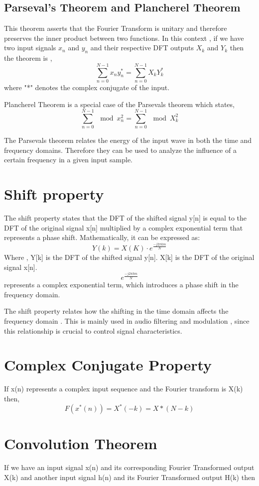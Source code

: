 \documentclass[11pt]{amsart}
\theoremstyle{definition}
\theoremstyle{remark}
\numberwithin{equation}{section}
\begin{document}
\subsection{Parseval's Theorem and Plancherel Theorem}
This theorem asserts that the Fourier Transform is unitary and therefore preserves the inner product between two functions. In this context , if we have two input signals $x_n$ and $y_n$ and their respective DFT outputs $X_k$ and $Y_k$ then the theorem is , 
\[\sum_{n = 0}^{N-1} x_n y_n^{*} = \sum_{n=0}^{N-1} X_k Y_k^{*}\]
where "*" denotes the complex conjugate of the input.

Plancherel Theorem is a special case of the Parsevals theorem which states,
\[\sum_{n = 0}^{N-1} \mod{ x_n^2} = \sum_{n=0}^{N-1} \mod{ X_k^2}\]

The Parsevals theorem relates the energy of the input wave in both the time and frequency domains. Therefore they can be used to analyze the influence of a certain frequency in a given input sample. 

\section{Shift property}
The shift property states that the DFT of the shifted signal y[n] is equal to the DFT of the original signal x[n] multiplied by a complex exponential term that represents a phase shift. Mathematically, it can be expressed as:
\[Y(k) = X(K) \cdot e^{\frac{-j2 \pi k m}{N}}\]
Where , 
Y[k] is the DFT of the shifted signal y[n].
X[k] is the DFT of the original signal x[n].
\[e^{\frac{-j 2 \pi km}{N}}\] represents a complex exponential term, which introduces a phase shift in the frequency domain.

The shift property relates how the shifting in the time domain affects the frequency domain . This is mainly used in audio filtering and modulation , since this relationship is crucial to control signal characteristics. 

\section{Complex Conjugate Property}
If x(n) represents a complex input sequence  and the Fourier transform is X(k) then, 
\[\textit{F}(x^{*}(n)) = X^{*}(-k) = X*(N-k)\]

\section{Convolution Theorem}
If we have an input signal x(n) and its corresponding Fourier Transformed output X(k) and another input signal h(n) and its Fourier Transformed output H(k) then
\end{document}
